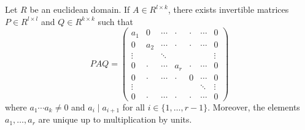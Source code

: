 \begin{theorem}
Let $R$ be an euclidean domain. If $A\in R^{l\times k}$,  
there exists invertible matrices $P\in R^{l\times l}$ and $Q\in R^{k\times k}$ such that 
\[
PAQ=\begin{pmatrix}
a_1 & 0 & \cdots & \cdot & \cdot & \cdots & 0\\
0 & a_2 & \cdots & \cdot & \cdot & \cdots & 0\\
\vdots && \ddots &  & & & \vdots\\	
0 & \cdot & \cdots & a_r & \cdot & \cdots & 0\\	
0 & \cdot & \cdots & \cdot & 0 & \cdots & 0\\	
\vdots &&&&&\ddots &\vdots\\
0 & \cdot & \cdots & \cdot & \cdot & \cdots & 0
\end{pmatrix}
\]
where $a_1\cdots a_k\ne 0$ and $a_i\mid a_{i+1}$ for all $i\in\{1,\dots,r-1\}$.
Moreover, the elements $a_1,\dots,a_r$ are unique up to multiplication by
units. 
\end{theorem}

